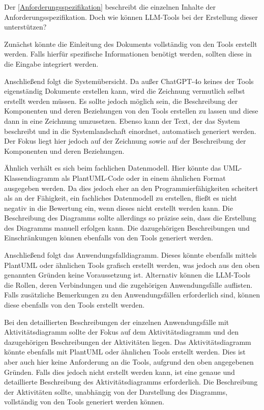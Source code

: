Der \autoref{Anforderungsspezifikation} beschreibt die einzelnen Inhalte der Anforderungsspezifikation. Doch wie 
können LLM-Tools bei der Erstellung dieser unterstützen?

Zunächst könnte die Einleitung des Dokuments vollständig von den Tools erstellt werden. Falls hierfür spezifische 
Informationen benötigt werden, sollten diese in die Eingabe integriert werden.

Anschließend folgt die Systemübersicht. Da außer ChatGPT-4o keines der Tools eigenständig Dokumente erstellen kann, 
wird die Zeichnung vermutlich selbst erstellt werden müssen. Es sollte jedoch möglich sein, die Beschreibung der 
Komponenten und deren Beziehungen von den Tools erstellen zu lassen und diese dann in eine Zeichnung umzusetzen. 
Ebenso kann der Text, der das System beschreibt und in die Systemlandschaft einordnet, automatisch generiert werden. 
Der Fokus liegt hier jedoch auf der Zeichnung sowie auf der Beschreibung der Komponenten und deren Beziehungen.

Ähnlich verhält es sich beim fachlichen Datenmodell. Hier könnte das UML-Klassendiagramm als PlantUML-Code oder 
in einem ähnlichen Format ausgegeben werden. Da dies jedoch eher an den Programmierfähigkeiten scheitert als an 
der Fähigkeit, ein fachliches Datenmodell zu erstellen, fließt es nicht negativ in die Bewertung ein, wenn dieses 
nicht erstellt werden kann. Die Beschreibung des Diagramms sollte allerdings so präzise sein, dass die Erstellung 
des Diagramms manuell erfolgen kann. Die dazugehörigen Beschreibungen und Einschränkungen können ebenfalls von den 
Tools generiert werden.

Anschließend folgt das Anwendungsfalldiagramm. Dieses könnte ebenfalls mittels PlantUML oder ähnlichen Tools 
grafisch erstellt werden, was jedoch aus den oben genannten Gründen keine Voraussetzung ist. Alternativ können 
die LLM-Tools die Rollen, deren Verbindungen und die zugehörigen Anwendungsfälle auflisten. Falls zusätzliche 
Bemerkungen zu den Anwendungsfällen erforderlich sind, können diese ebenfalls von den Tools erstellt werden.

Bei den detaillierten Beschreibungen der einzelnen Anwendungsfälle mit Aktivitätsdiagramm sollte der Fokus auf 
dem Aktivitätsdiagramm und den dazugehörigen Beschreibungen der Aktivitäten liegen. Das Aktivitätsdiagramm 
könnte ebenfalls mit PlantUML oder ähnlichen Tools erstellt werden. Dies ist aber auch hier keine Anforderung an 
die Tools, aufgrund den oben angegebenen Gründen. Falls dies jedoch nicht erstellt werden kann, ist eine genaue 
und detaillierte Beschreibung des Aktivitätsdiagramms erforderlich. Die Beschreibung der Aktivitäten 
sollte, unabhängig von der Darstellung des Diagramms, vollständig von den Tools generiert werden können.

